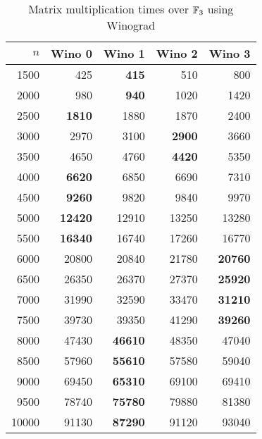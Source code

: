 \begin{table}[ht]
\begin{center}
\begin{tabular}{|r||r|r|r|r|}
\hline
$n$ & Wino 0 & Wino 1 & Wino 2 & Wino 3 \\
\hline
1500 & 425 & \textbf{415} & 510 & 800\\
2000 & 980 & \textbf{940} & 1020 & 1420\\
2500 & \textbf{1810} & 1880 & 1870 & 2400\\
3000 & 2970 & 3100 & \textbf{2900} & 3660\\
3500 & 4650 & 4760 & \textbf{4420} & 5350\\
4000 & \textbf{6620} & 6850 & 6690 & 7310\\
4500 & \textbf{9260} & 9820 & 9840 & 9970\\
5000 & \textbf{12420} & 12910 & 13250 & 13280\\
5500 & \textbf{16340} & 16740 & 17260 & 16770\\
6000 & 20800 & 20840 & 21780 & \textbf{20760}\\
6500 & 26350 & 26370 & 27370 & \textbf{25920}\\
7000 & 31990 & 32590 & 33470 & \textbf{31210}\\
7500 & 39730 & 39350 & 41290 & \textbf{39260}\\
8000 & 47430 & \textbf{46610} & 48350 & 47040\\
8500 & 57960 & \textbf{55610} & 57580 & 59040\\
9000 & 69450 & \textbf{65310} & 69100 & 69410\\
9500 & 78740 & \textbf{75780} & 79880 & 81380\\
10000 & 91130 & \textbf{87290} & 91120 & 93040\\
\hline
\end{tabular}
\end{center}
\caption{Matrix multiplication times over $\mathbb{F}_3$ using Winograd}
\label{MatMulWinograd3}
%
\end{table}

